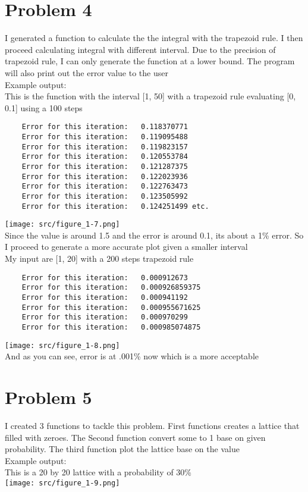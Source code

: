 \documentclass[a4paper]{article}
\begin{document}
    \section{Problem 4}
    I generated a function to calculate the the integral with the trapezoid rule. I then proceed calculating integral with different interval. Due to the precision of trapezoid rule, I can only generate the function at a lower bound. The program will also print out the error value to the user 
    \\Example output:
    \\This is the function with the interval [1, 50] with a trapezoid rule evaluating [0, 0.1] using a 100 steps
    \begin{verbatim}
    Error for this iteration:   0.118370771
    Error for this iteration:   0.119095488
    Error for this iteration:   0.119823157
    Error for this iteration:   0.120553784
    Error for this iteration:   0.121287375
    Error for this iteration:   0.122023936
    Error for this iteration:   0.122763473
    Error for this iteration:   0.123505992
    Error for this iteration:   0.124251499 etc.
    \end{verbatim}
    \texttt{[image: src/figure\_1-7.png]}
    \\Since the value is around 1.5 and the error is around 0.1, its about a 1\% error. So I proceed to generate a more accurate plot given a smaller interval 
    \\My input are [1, 20] with a 200 steps trapezoid rule\\
    \begin{verbatim}
    Error for this iteration:   0.000912673
    Error for this iteration:   0.000926859375
    Error for this iteration:   0.000941192
    Error for this iteration:   0.000955671625
    Error for this iteration:   0.000970299
    Error for this iteration:   0.000985074875
    \end{verbatim}
    \texttt{[image: src/figure\_1-8.png]}
    \\And as you can see, error is at .001\% now which is a more acceptable
    
    \section{Problem 5}
    I created 3 functions to tackle this problem. First functions creates a lattice that filled with zeroes. The Second function convert some to 1 base on given probability. The third function plot the lattice base on the value
    \\Example output:
    \\This is a 20 by 20 lattice with a probability of 30\%\\
    \texttt{[image: src/figure\_1-9.png]}
\end{document}
